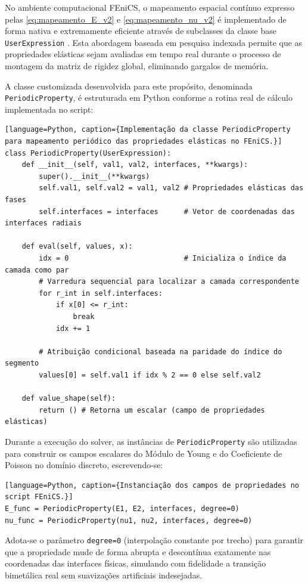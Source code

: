 No ambiente computacional FEniCS, o mapeamento espacial contínuo expresso pelas \eqref{eq:mapeamento_E_v2} e \eqref{eq:mapeamento_nu_v2} é implementado de forma nativa e extremamente eficiente através de subclasses da classe base \texttt{UserExpression} \cite{logg2012automated}. Esta abordagem baseada em pesquisa indexada permite que as propriedades elásticas sejam avaliadas em tempo real durante o processo de montagem da matriz de rigidez global, eliminando gargalos de memória.

A classe customizada desenvolvida para este propósito, denominada \texttt{PeriodicProperty}, é estruturada em Python conforme a rotina real de cálculo implementada no script:

\begin{verbatim}[language=Python, caption={Implementação da classe PeriodicProperty para mapeamento periódico das propriedades elásticas no FEniCS.}]
class PeriodicProperty(UserExpression):
    def __init__(self, val1, val2, interfaces, **kwargs):
        super().__init__(**kwargs)
        self.val1, self.val2 = val1, val2 # Propriedades elásticas das fases
        self.interfaces = interfaces      # Vetor de coordenadas das interfaces radiais

    def eval(self, values, x):
        idx = 0                           # Inicializa o índice da camada como par
        # Varredura sequencial para localizar a camada correspondente
        for r_int in self.interfaces:
            if x[0] <= r_int:
                break
            idx += 1

        # Atribuição condicional baseada na paridade do índice do segmento
        values[0] = self.val1 if idx % 2 == 0 else self.val2

    def value_shape(self):
        return () # Retorna um escalar (campo de propriedades elásticas)
\end{verbatim}

Durante a execução do solver, as instâncias de \texttt{PeriodicProperty} são utilizadas para construir os campos escalares do Módulo de Young e do Coeficiente de Poisson no domínio discreto, escrevendo-se:

\begin{verbatim}[language=Python, caption={Instanciação dos campos de propriedades no script FEniCS.}]
E_func = PeriodicProperty(E1, E2, interfaces, degree=0)
nu_func = PeriodicProperty(nu1, nu2, interfaces, degree=0)
\end{verbatim}

Adota-se o parâmetro \texttt{degree=0} (interpolação constante por trecho) para garantir que a propriedade mude de forma abrupta e descontínua exatamente nas coordenadas das interfaces físicas, simulando com fidelidade a transição bimetálica real sem suavizações artificiais indesejadas.


